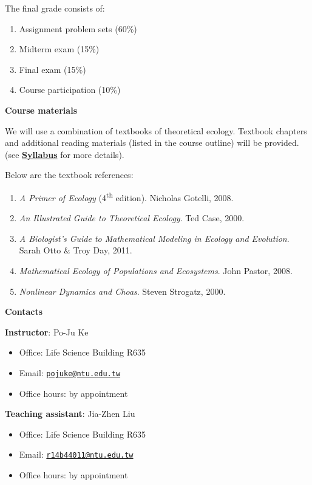 \documentclass[
]{book}
\providecommand{\tightlist}{%
  \setlength{\itemsep}{0pt}\setlength{\parskip}{0pt}}
\begin{document}
The final grade consists of:

\begin{enumerate}
\def\labelenumi{(\arabic{enumi})}
\tightlist
\item
  Assignment problem sets (60\%)
\item
  Midterm exam (15\%)
\item
  Final exam (15\%)
\item
  Course participation (10\%)
\end{enumerate}

\textbf{Course materials}

We will use a combination of textbooks of theoretical ecology. Textbook chapters and additional reading materials (listed in the course outline) will be provided. (see \href{https://pojuke.github.io/TheoreticalEcologyPJK/syllabus.html}{\textbf{Syllabus}} for more details).

Below are the textbook references:

\begin{enumerate}
\def\labelenumi{(\arabic{enumi})}
\tightlist
\item
  \emph{A Primer of Ecology} (4\textsuperscript{th} edition). Nicholas Gotelli, 2008.
\item
  \emph{An Illustrated Guide to Theoretical Ecology}. Ted Case, 2000.
\item
  \emph{A Biologist's Guide to Mathematical Modeling in Ecology and Evolution}. Sarah Otto \& Troy Day, 2011.
\item
  \emph{Mathematical Ecology of Populations and Ecosystems}. John Pastor, 2008.
\item
  \emph{Nonlinear Dynamics and Choas}. Steven Strogatz, 2000.
\end{enumerate}

\textbf{Contacts}

\textbf{Instructor}: Po-Ju Ke

\begin{itemize}
\tightlist
\item
  Office: Life Science Building R635
\item
  Email: \href{mailto:pojuke@ntu.edu.tw}{\nolinkurl{pojuke@ntu.edu.tw}}
\item
  Office hours: by appointment
\end{itemize}

\textbf{Teaching assistant}: Jia-Zhen Liu

\begin{itemize}
\tightlist
\item
  Office: Life Science Building R635
\item
  Email: \href{mailto:r14b44011@ntu.edu.tw}{\nolinkurl{r14b44011@ntu.edu.tw}}
\item
  Office hours: by appointment
\end{itemize}
\end{document}
